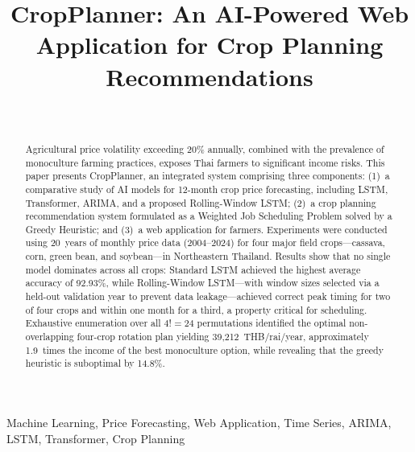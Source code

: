 \documentclass[journal]{IEEEtran}
\begin{document}
\title{CropPlanner: An AI-Powered Web Application for Crop Planning Recommendations}

\author{
   \\
}

\maketitle

\begin{abstract}
Agricultural price volatility exceeding 20\% annually, combined with the prevalence of monoculture farming practices, exposes Thai farmers to significant income risks. This paper presents CropPlanner, an integrated system comprising three components: (1)~a comparative study of AI models for 12-month crop price forecasting, including LSTM, Transformer, ARIMA, and a proposed Rolling-Window LSTM; (2)~a crop planning recommendation system formulated as a Weighted Job Scheduling Problem solved by a Greedy Heuristic; and (3)~a web application for farmers. Experiments were conducted using 20~years of monthly price data (2004--2024) for four major field crops---cassava, corn, green bean, and soybean---in Northeastern Thailand. Results show that no single model dominates across all crops: Standard LSTM achieved the highest average accuracy of 92.93\%, while Rolling-Window LSTM---with window sizes selected via a held-out validation year to prevent data leakage---achieved correct peak timing for two of four crops and within one month for a third, a property critical for scheduling. Exhaustive enumeration over all $4! = 24$ permutations identified the optimal non-overlapping four-crop rotation plan yielding 39,212~THB/rai/year, approximately 1.9~times the income of the best monoculture option, while revealing that the greedy heuristic is suboptimal by 14.8\%.
\end{abstract}

\begin{IEEEkeywords}
Machine Learning, Price Forecasting, Web Application, Time Series, ARIMA, LSTM, Transformer, Crop Planning
\end{IEEEkeywords}
\end{document}
